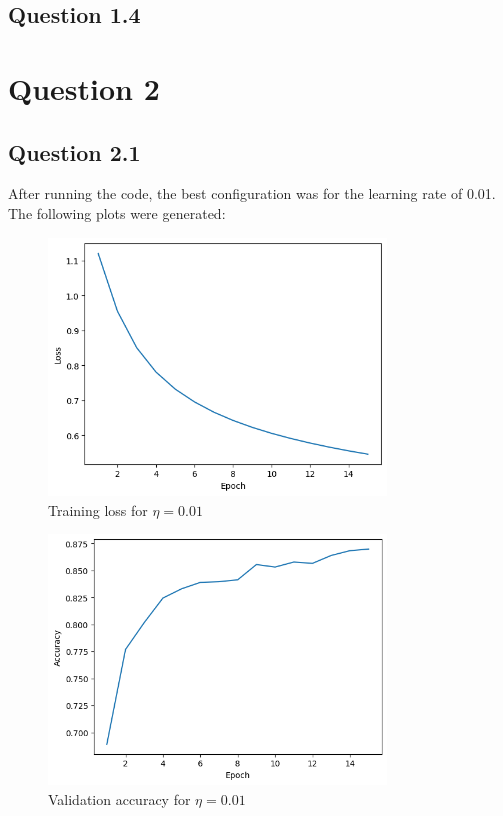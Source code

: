\documentclass{article}
\begin{document}
\subsection{Question 1.4}

\section{Question 2}

\subsection{Question 2.1}
After running the code, the best configuration was for the learning rate of 0.01.
The following plots were generated:

\begin{figure}[H]
    \centering
    \includegraphics[width=0.8\textwidth]{plots/CNN-training-loss-0.01-0.7-0-sgd-False.png}
    \caption{Training loss for $\eta=0.01$}
    \label{fig:2.1-training_loss}
\end{figure}

\begin{figure}[H]
    \centering
    \includegraphics[width=0.8\textwidth]{plots/CNN-validation-accuracy-0.01-0.7-0-sgd-False.png}
    \caption{Validation accuracy for $\eta=0.01$}
    \label{fig:2.1-validation_accuracy}
\end{figure}
\end{document}
